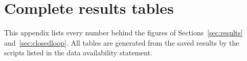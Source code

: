 \section{Complete results tables}\label{app:tables}

This appendix lists every number behind the figures of Sections~\ref{sec:results} and~\ref{sec:closedloop}. All
tables are generated from the saved results by the scripts listed in the data availability statement.








